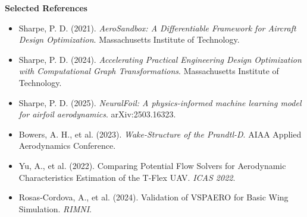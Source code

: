 \documentclass[18pt]{extarticle}
\newcommand{\sectionbar}[1]{%
  \vspace{0.10\baselineskip}%
  \colorbox{prismblue}{%
    \parbox[c][0.78in][c]{\dimexpr\linewidth-2\fboxsep\relax}{%
      \hspace{0.35em}\color{white}\bfseries\fontsize{39}{43}\selectfont #1%
    }%
  }%
  \vspace{0.20\baselineskip}%
}
\begin{document}
\begin{minipage}[t]{0.29\linewidth}
  \sectionbar{Selected References}
  {\fontsize{16}{20}\selectfont
  \begin{itemize}
    \item Sharpe, P. D. (2021). \textit{AeroSandbox: A Differentiable Framework for Aircraft Design Optimization}. Massachusetts Institute of Technology.
    \item Sharpe, P. D. (2024). \textit{Accelerating Practical Engineering Design Optimization with Computational Graph Transformations}. Massachusetts Institute of Technology.
    \item Sharpe, P. D. (2025). \textit{NeuralFoil: A physics-informed machine learning model for airfoil aerodynamics}. arXiv:2503.16323.
    \item Bowers, A. H., et al. (2023). \textit{Wake-Structure of the Prandtl-D}. AIAA Applied Aerodynamics Conference.
    \item Yu, A., et al. (2022). Comparing Potential Flow Solvers for Aerodynamic Characteristics Estimation of the T-Flex UAV. \textit{ICAS 2022}.
    \item Rosas-Cordova, A., et al. (2024). Validation of VSPAERO for Basic Wing Simulation. \textit{RIMNI}.
  \end{itemize}
  }
\end{minipage}
\end{document}
